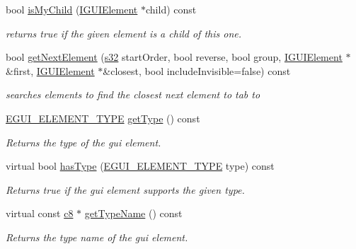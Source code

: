 \begin{DoxyCompactItemize}
bool \hyperlink{classirr_1_1gui_1_1IGUIElement_a72fe3668d62bfb7edc4586d582a947b4}{is\+My\+Child} (\hyperlink{classirr_1_1gui_1_1IGUIElement}{I\+G\+U\+I\+Element} $\ast$child) const
\begin{DoxyCompactList}\small\item\em returns true if the given element is a child of this one. \end{DoxyCompactList}\item 
bool \hyperlink{classirr_1_1gui_1_1IGUIElement_aaf461c857c9005d310635e56dc384ed4}{get\+Next\+Element} (\hyperlink{namespaceirr_ac66849b7a6ed16e30ebede579f9b47c6}{s32} start\+Order, bool reverse, bool group, \hyperlink{classirr_1_1gui_1_1IGUIElement}{I\+G\+U\+I\+Element} $\ast$\&first, \hyperlink{classirr_1_1gui_1_1IGUIElement}{I\+G\+U\+I\+Element} $\ast$\&closest, bool include\+Invisible=false) const
\begin{DoxyCompactList}\small\item\em searches elements to find the closest next element to tab to \end{DoxyCompactList}\item 
\hyperlink{namespaceirr_1_1gui_ae4d66df0ecf4117cdbcf9f22404bd254}{E\+G\+U\+I\+\_\+\+E\+L\+E\+M\+E\+N\+T\+\_\+\+T\+Y\+PE} \hyperlink{classirr_1_1gui_1_1IGUIElement_aeb2f4dec42afc4b8c1182897d0dc1a70}{get\+Type} () const
\begin{DoxyCompactList}\small\item\em Returns the type of the gui element. \end{DoxyCompactList}\item 
virtual bool \hyperlink{classirr_1_1gui_1_1IGUIElement_a3c9f0356f89f4906c7bf5a302e57f01d}{has\+Type} (\hyperlink{namespaceirr_1_1gui_ae4d66df0ecf4117cdbcf9f22404bd254}{E\+G\+U\+I\+\_\+\+E\+L\+E\+M\+E\+N\+T\+\_\+\+T\+Y\+PE} type) const
\begin{DoxyCompactList}\small\item\em Returns true if the gui element supports the given type. \end{DoxyCompactList}\item 
virtual const \hyperlink{namespaceirr_a9395eaea339bcb546b319e9c96bf7410}{c8} $\ast$ \hyperlink{classirr_1_1gui_1_1IGUIElement_a656d2055c0d61382afee1d494c275ce9}{get\+Type\+Name} () const
\begin{DoxyCompactList}\small\item\em Returns the type name of the gui element. \end{DoxyCompactList}\item 

\end{DoxyCompactItemize}
